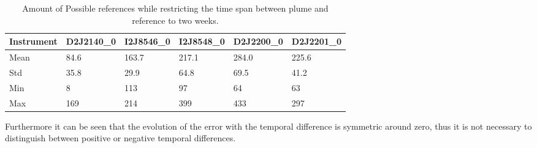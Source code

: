\documentclass  [
  paper    = a4,
  BCOR     = 10mm,
  twoside,
  fontsize = 12pt,
  fleqn,
  toc      = bibnumbered,
  toc      = listofnumbered,
  numbers  = noendperiod,
  headings = normal,
  listof   = leveldown,
  version  = 3.03
]                                       {scrreprt}
\begin{document}
	\begin{table}[h]
		\begin{tabular}{|p{2cm}|p{2cm}|p{2cm}|p{2cm}|p{2cm}|p{2cm}|}
			Instrument	&D2J2140\_0&I2J8546\_0& I2J8548\_0&D2J2200\_0&D2J2201\_0\\
			\toprule
			Mean&84.6&163.7 &217.1&284.0&225.6\\
			\midrule
			Std&
			35.8&
			29.9&
			64.8&
			69.5&
			41.2\\
			\midrule
			Min&8&113&97&64 &63\\
			\midrule
			Max&169&214&399&433 &297 \\
			\bottomrule
		\end{tabular}
	\caption{Amount of Possible references while restricting the time span between plume and reference to two weeks.}
	\label{Tab:refstime}
	\end{table}	

	Furthermore it can be seen that the evolution of the   error with the temporal difference is symmetric around zero, thus it is not necessary to distinguish between positive or negative temporal differences.\\

	
\end{document}
